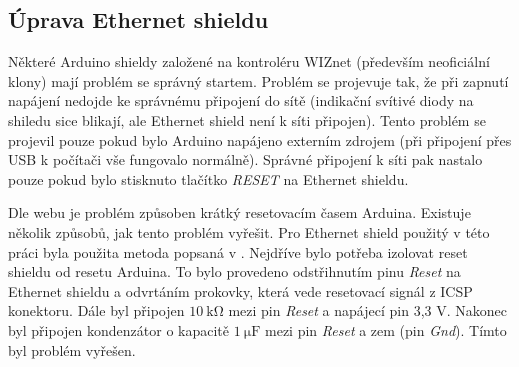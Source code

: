 \subsection{Úprava Ethernet shieldu}
\label{sec:ArdShiel_mod}
Některé Arduino shieldy založené na kontroléru WIZnet (především neoficiální klony) mají problém se správný startem. Problém se projevuje tak, že při zapnutí napájení nedojde ke správnému připojení do sítě (indikační svítivé diody na shiledu sice blikají, ale Ethernet shield není k síti připojen). Tento problém se projevil pouze pokud bylo Arduino napájeno externím zdrojem (při připojení přes USB k počítači vše fungovalo normálně). Správné připojení k síti pak nastalo pouze pokud bylo stisknuto tlačítko \textit{RESET} na Ethernet shieldu.

Dle webu \cite{EthShieldError} je problém způsoben krátký resetovacím časem Arduina. Existuje několik způsobů, jak tento problém vyřešit. Pro Ethernet shield použitý v této práci byla použita metoda popsaná v \cite{EthShieldModification}. Nejdříve bylo potřeba izolovat reset shieldu od resetu Arduina. To bylo provedeno odstřihnutím pinu \textit{Reset} na Ethernet shieldu a odvrtáním prokovky, která vede resetovací signál z ICSP konektoru. Dále byl připojen $10 \ \mathrm{k\Omega}$ mezi pin \textit{Reset} a napájecí pin 3,3 V. Nakonec byl připojen kondenzátor o kapacitě $1 \ \mathrm{\mu F}$ mezi pin \textit{Reset} a zem (pin \textit{Gnd}). Tímto byl problém vyřešen.

